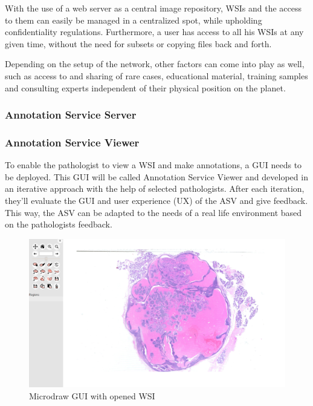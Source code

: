 With the use of a web server as a central image repository, WSIs and the access to them can easily be managed in a centralized spot, while upholding confidentiality regulations. Furthermore, a user has access to all his WSIs at any given time, without the need for subsets or copying files back and forth.

Depending on the setup of the network, other factors can come into play as well, such as access to and sharing of rare cases, educational material, training samples and consulting experts independent of their physical position on the planet\cite{Wilbur09}.


\subsubsection{Annotation Service Server}


\subsubsection{Annotation Service Viewer}
To enable the pathologist to view a WSI and make annotations, a GUI needs to be deployed. This GUI will be called Annotation Service Viewer and developed in an iterative approach with the help of selected pathologists. After each iteration, they'll evaluate the GUI and user experience (UX) of the ASV and give feedback. This way, the ASV can be adapted to the needs of a real life environment based on the pathologists feedback.

\begin{figure}[H]
	\begin{center}
		\includegraphics[scale=0.2]{img/microdrawUI.png}
		\caption{Microdraw GUI with opened WSI}
		\label{fig4_microdrawUI}
	\end{center}
\end{figure}

